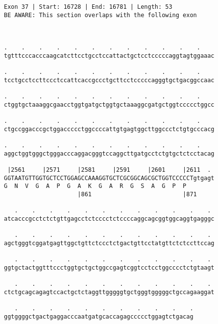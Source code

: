 \documentclass{article}
\begin{document}
\begin{Verbatim}
Exon 37 | Start: 16728 | End: 16781 | Length: 53
BE AWARE: This section overlaps with the following exon



.    .    .    .    .    .    .    .    .    .    .    .    
tgtttcccacccaagcatcttcctgcctccattactgctcctcccccaggtagtggaaac
                                                            
.    .    .    .    .    .    .    .    .    .    .    .    
tcctgcctccttccctccattcaccgccctgcttcctcccccagggtgctgacggccaac
                                                            
.    .    .    .    .    .    .    .    .    .    .    .    
ctggtgctaaaggcgaacctggtgatgctggtgctaaaggcgatgctggtccccctggcc
                                                            
.    .    .    .    .    .    .    .    .    .    .    .    
ctgccggacccgctggaccccctggccccattgtgagtggcttggccctctgtgcccacg
                                                            
.    .    .    .    .    .    .    .    .    .    .    .    
aggctggtgggctgggacccaggacgggtccaggcttgatgcctctgtgctctcctacag
                                                            
 |2561     |2571     |2581     |2591     |2601     |2611  . 
GGTAATGTTGGTGCTCCTGGAGCCAAAGGTGCTCGCGGCAGCGCTGGTCCCCCTgtgagt
G  N  V  G  A  P  G  A  K  G  A  R  G  S  A  G  P  P        
                     |861                          |871     
  
   .    .    .    .    .    .    .    .    .    .    .    . 
atcacccgcctctctgttgagcctctcccctctccccaggcagcggtggcaggtgagggc
                                                            
   .    .    .    .    .    .    .    .    .    .    .    . 
agctgggtcggatgagttggctgttctccctctgactgttcctatgttctctccttccag
                                                            
   .    .    .    .    .    .    .    .    .    .    .    . 
ggtgctactggtttccctggtgctgctggccgagtcggtcctcctggcccctctgtaagt
                                                            
   .    .    .    .    .    .    .    .    .    .    .    . 
ctctgcagcagagtccactgctctaggttgggggtgctgggtgggggctgccagaaggat
                                                            
   .    .    .    .    .    .    .    .    .    .    .
ggtggggctgactgaggacccaatgatgcaccagagccccctggagtctgacag
                                                      

\end{Verbatim}
\end{document}
